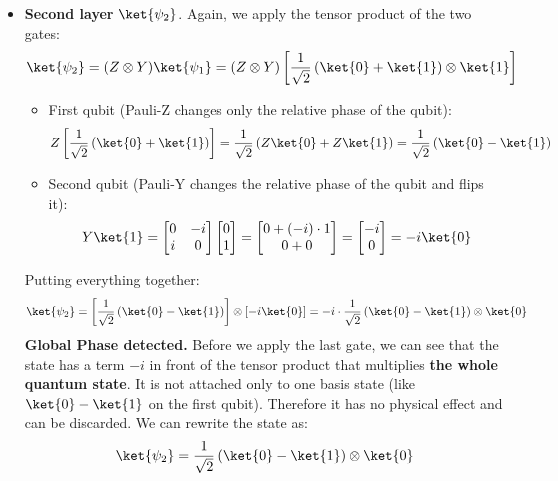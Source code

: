 \begin{itemize}
    \item \textbf{Second layer} $\ket{\psi_2}$. Again, we apply the tensor product of the two gates:
    \begin{equation*}
        \ket{\psi_2} = (Z \otimes Y) \ket{\psi_1} = (Z \otimes Y) \left[\frac{1}{\sqrt{2}} \left(\ket{0} + \ket{1}\right) \otimes \ket{1}\right]
    \end{equation*}
    \begin{itemize}
        \item First qubit (Pauli-Z changes only the relative phase of the  qubit):
        \begin{equation*}
            Z \left[\frac{1}{\sqrt{2}} \left(\ket{0} + \ket{1}\right)\right] = \frac{1}{\sqrt{2}} \left(Z\ket{0} + Z\ket{1}\right) = \frac{1}{\sqrt{2}} \left(\ket{0} - \ket{1}\right)
        \end{equation*}
        \item Second qubit (Pauli-Y changes the relative phase of the  qubit and flips it):
        \begin{equation*}
            Y \ket{1} = \begin{bmatrix}
                0 & -i \\
                i & 0
            \end{bmatrix} \begin{bmatrix}
                0 \\
                1
            \end{bmatrix} = \begin{bmatrix}
                0 + (-i) \cdot 1 \\
                0 + 0
            \end{bmatrix} =
            \begin{bmatrix}
                -i \\
                0
            \end{bmatrix} = -i \ket{0}
        \end{equation*}
    \end{itemize}
    Putting everything together:
    \begin{equation*}
        \ket{\psi_2} = \left[\frac{1}{\sqrt{2}} \left(\ket{0} - \ket{1}\right)\right] \otimes \left[-i \ket{0}\right] = -i \cdot \frac{1}{\sqrt{2}} \left(\ket{0} - \ket{1}\right) \otimes \ket{0}
    \end{equation*}
    \textcolor{Green3}{ \textbf{Global Phase detected.}} Before we apply the last gate, we can see that the state has a term $-i$ in front of the tensor product that multiplies \textbf{the whole quantum state}. It is not attached only to one basis state (like $\ket{0} - \ket{1}$ on the first qubit). Therefore it has no physical effect and can be discarded. We can rewrite the state as:
    \begin{equation*}
        \ket{\psi_2} = \frac{1}{\sqrt{2}} \left(\ket{0} - \ket{1}\right) \otimes \ket{0}
    \end{equation*}



\end{itemize}

